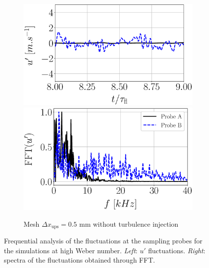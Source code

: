 \begin{figure}[ht]
\begin{subfigure}[b]{1.0\textwidth}
	\centering
   \includegraphics[scale=0.28]{./part2_developments/figures_ch5_resolved_JICF/results_ics_mesh_convergence_probes/up_dx0p5_no_turb.eps}
   \includegraphics[scale=0.28]{./part2_developments/figures_ch5_resolved_JICF/results_ics_mesh_convergence_probes/spectra_linear_scale_dx0p5_no_turb.eps}
   \caption{Mesh $\Delta x_\mathrm{ups} = 0.5$ mm without turbulence injection}
   \label{fig:ics_mesh_independency_study_probes_dx0p5_no_turb}
\end{subfigure}

\caption[Frequential analysis of the fluctuations at the sampling probes for the simulations at high Weber number.]{Frequential analysis of the fluctuations at the sampling probes for the simulations at high Weber number. \textsl{Left}: $u'$ fluctuations. \textsl{Right}: spectra of the fluctuations obtained through FFT.}
\label{fig:ics_mesh_independency_study_probes}
\end{figure}




